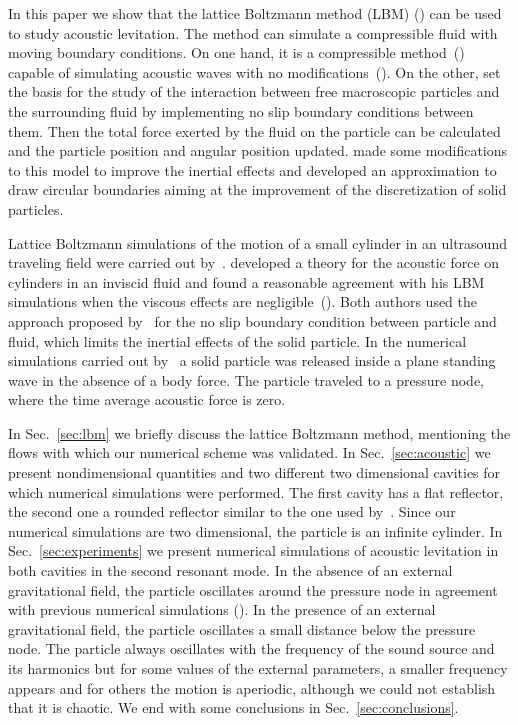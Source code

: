 In this paper we show that the lattice Boltzmann method (LBM) 
(\cite{mcn88, higuera89,benzi92}) can be used to study acoustic levitation. The 
method can simulate a compressible fluid with moving 
boundary conditions. On one hand, it is a compressible method~(\cite{alexander92}) capable 
of simulating acoustic waves with no modifications~(\cite{buick98,buick00}). On the other, 
\cite{ladd94,ladd94b} set the basis for the study of the 
interaction between free macroscopic particles and the surrounding fluid by implementing
no slip boundary conditions between them. Then the total force exerted by the fluid on 
the particle can be calculated and the particle position and angular position updated.
\cite{aidun98} made some modifications to this model to improve the inertial effects and
\cite{filippova97} developed an approximation to draw circular boundaries aiming at the 
improvement of the discretization of solid particles. 

Lattice Boltzmann simulations of the motion of a small cylinder in an ultrasound traveling 
field were carried out by~\cite{cosgrove04}. \cite{haydock05b} developed a theory
for the acoustic force on cylinders in an inviscid fluid and found a reasonable 
agreement with his LBM simulations when the viscous effects are 
negligible~(\cite{haydock05}). Both authors used the approach proposed 
by~\cite{ladd94,ladd94b} for the no slip boundary condition between particle and fluid,
which limits the inertial effects of the solid particle. In the numerical simulations 
carried out by~\cite{haydock05} a solid particle was released inside a plane standing wave 
in the absence of a body force. The particle traveled to a pressure node, where the time 
average acoustic force is zero. 

In Sec.~\ref{sec:lbm} we briefly discuss the lattice Boltzmann method, mentioning the flows
with which our numerical scheme was validated. In Sec.~\ref{sec:acoustic} we present 
nondimensional quantities and two different two dimensional cavities for which numerical 
simulations were performed. The first cavity has a flat reflector, the second one a rounded 
reflector similar to the one used by~\cite{xie01}. Since our numerical simulations are two 
dimensional, the particle is an infinite cylinder.
In Sec.~\ref{sec:experiments} we present numerical simulations of acoustic levitation 
in both cavities in the second resonant mode. In the absence of 
an external gravitational field, the particle 
oscillates around the pressure node in agreement with previous numerical 
simulations (\cite{haydock05}). In the presence of an external gravitational field, 
the particle oscillates a small distance below the pressure node.
The particle always oscillates with the frequency of the sound source and its harmonics 
but for some values of the external parameters, a smaller frequency appears and for others 
the motion is aperiodic, although we could not establish that it is chaotic. We end 
with some conclusions in Sec.~\ref{sec:conclusions}.

